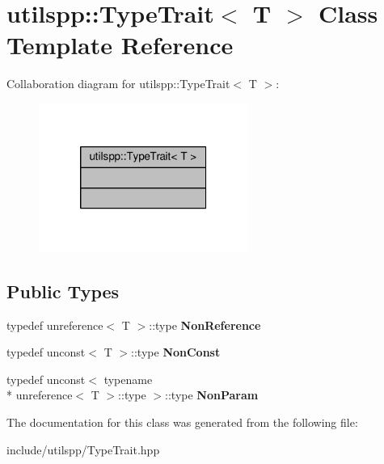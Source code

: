 \hypertarget{classutilspp_1_1TypeTrait}{\section{utilspp\-:\-:Type\-Trait$<$ T $>$ Class Template Reference}
\label{classutilspp_1_1TypeTrait}
}


Collaboration diagram for utilspp\-:\-:Type\-Trait$<$ T $>$\-:
\nopagebreak
\begin{figure}[H]
\begin{center}
\leavevmode
\includegraphics[width=194pt]{classutilspp_1_1TypeTrait__coll__graph}
\end{center}
\end{figure}
\subsection*{Public Types}
\begin{DoxyCompactItemize}
\item 
\hypertarget{classutilspp_1_1TypeTrait_afbee8025768eed8ae5a108e4f1f108c2}{typedef unreference$<$ T $>$\-::type {\bfseries Non\-Reference}}\label{classutilspp_1_1TypeTrait_afbee8025768eed8ae5a108e4f1f108c2}

\item 
\hypertarget{classutilspp_1_1TypeTrait_a31673fb504aa9bc8382c3da39279b6fe}{typedef unconst$<$ T $>$\-::type {\bfseries Non\-Const}}\label{classutilspp_1_1TypeTrait_a31673fb504aa9bc8382c3da39279b6fe}

\item 
\hypertarget{classutilspp_1_1TypeTrait_ae94576b46bc786ddb9465b9ba1eedca2}{typedef unconst$<$ typename \\*
unreference$<$ T $>$\-::type $>$\-::type {\bfseries Non\-Param}}\label{classutilspp_1_1TypeTrait_ae94576b46bc786ddb9465b9ba1eedca2}

\end{DoxyCompactItemize}


The documentation for this class was generated from the following file\-:\begin{DoxyCompactItemize}
\item 
include/utilspp/Type\-Trait.\-hpp\end{DoxyCompactItemize}
